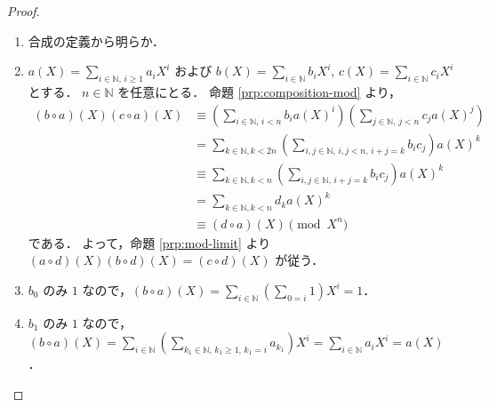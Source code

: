 \documentclass{jsarticle}
\newcommand{\N}{\mathbb{N}}
\theoremstyle{definition}
\newenvironment{prf}{\begin{leftbar}\begin{proof}}{\end{proof}\end{leftbar}}
\begin{document}
\begin{prf}
  \begin{enumerate}[(1)]
    \item 合成の定義から明らか．
    \item $a(X) = \sum_{i\in\N,\,i\ge 1} a_i X^i$ および $b(X) = \sum_{i\in\N} b_i X^i$, $c(X) = \sum_{i\in\N} c_i X^i$ とする．
        $n \in \N$ を任意にとる．
        命題 \ref{prp:composition-mod} より，
        \begin{align*}
          (b \circ a)(X) (c \circ a)(X)
          &\equiv \left( \sum_{i\in\N,\,i<n} b_i a(X)^i \right) \left( \sum_{j\in\N,\,j<n} c_j a(X)^j \right) \\
          &= \sum_{k\in\N,k<2n} \left( \sum_{i,j\in\N,\,i,j<n,\,i+j=k} b_i c_j \right) a(X)^k \\
          &\equiv \sum_{k\in\N,k<n} \left( \sum_{i,j\in\N,\,i+j=k} b_i c_j \right) a(X)^k \\
          &= \sum_{k\in\N,k<n} d_k a(X)^k \\
          &\equiv (d \circ a)(X) \pmod{X^n}
        \end{align*}
        である．
        よって，命題 \ref{prp:mod-limit} より $(a \circ d)(X) (b \circ d)(X) = (c \circ d)(X)$ が従う．
    \item $b_0$ のみ $1$ なので，$(b \circ a)(X) = \sum_{i\in\N} \left( \sum_{0=i} 1 \right) X^i = 1$．
    \item $b_1$ のみ $1$ なので，$(b \circ a)(X) = \sum_{i\in\N} \left( \sum_{k_1\in\N,\,k_1\ge 1,\,k_1=i} a_{k_1} \right) X^i = \sum_{i\in\N} a_i X^i = a(X)$．
  \end{enumerate}
\end{prf}
\end{document}
